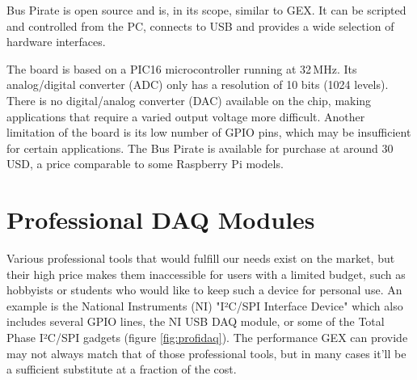 Bus Pirate is open source and is, in its scope, similar to GEX. It can be scripted and controlled from the PC, connects to USB and provides a wide selection of hardware interfaces.

The board is based on a PIC16 microcontroller running at 32\,MHz. Its analog/digital converter (ADC) only has a resolution of 10 bits (1024 levels). There is no digital/analog converter (DAC) available on the chip, making applications that require a varied output voltage more difficult. Another limitation of the board is its low number of GPIO pins, which may be insufficient for certain applications. The Bus Pirate is available for purchase at around 30\,USD, a price comparable to some Raspberry Pi models.

\section{Professional DAQ Modules}

Various professional tools that would fulfill our needs exist on the market, but their high price makes them inaccessible for users with a limited budget, such as hobbyists or students who would like to keep such a device for personal use. An example is the National Instruments (NI) "I²C/SPI Interface Device" which also includes several GPIO lines, the NI USB DAQ module, or some of the Total Phase I²C/SPI gadgets (figure \ref{fig:profidaq}). The performance GEX can provide may not always match that of those professional tools, but in many cases it'll be a sufficient substitute at a fraction of the cost.

